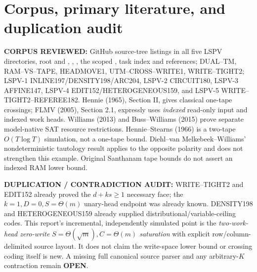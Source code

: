 \documentclass[11pt]{article}
\begin{document}
\section{Corpus, primary literature, and duplication audit}
\noindent\textbf{CORPUS REVIEWED:} GitHub source-tree listings in all five LSPV directories, root  and , , , the scoped , task index and references; DUAL--TM, RAM--VS--TAPE, HEADMOVE1, UTM--CROSS--WRITE1, WRITE--TIGHT2; LSPV-1 INLINE197/DENSITY198/ARC204, LSPV-2 CIRCUIT180, LSPV-3 AFFINE147, LSPV-4 EDIT152/HETEROGENEOUS159, and LSPV-5 WRITE--TIGHT2--REFEREE182. Hennie (1965), Section II, gives classical one-tape crossings; FLMV (2005), Section 2.1, expressly uses \emph{indexed} read-only input and indexed work heads. Williams (2013) and Buss--Williams (2015) prove separate model-native SAT resource restrictions. Hennie--Stearns (1966) is a two-tape \(O(T\log T)\) simulation, not a one-tape bound. Diehl--van Melkebeek--Williams' nondeterministic tautology result applies to the opposite polarity and does not strengthen this example. Original Santhanam tape bounds do not assert an indexed RAM lower bound.

\noindent\textbf{DUPLICATION / CONTRADICTION AUDIT:} WRITE--TIGHT2 and EDIT152 already proved the \(d+ks\ge1\) necessary face; the \(k=1,D=0,S=\Theta(m)\) unary-head endpoint was already known. DENSITY198 and HETEROGENEOUS159 already supplied distributional/variable-ceiling codes. This report's incremental, independently simulated point is the \emph{two-work-head zero-write \(S=\Theta(\sqrt m),C=\Theta(m)\) saturation} with explicit row/column-delimited source layout. It does not claim the write-space lower bound or crossing coding itself is new. A missing full canonical source parser and any arbitrary-\(K\) contraction remain \textbf{OPEN}.
\end{document}
